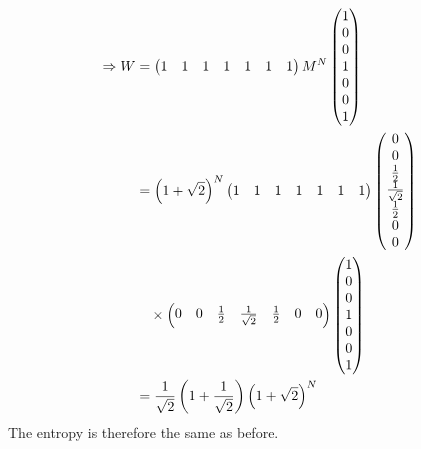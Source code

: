 \begin{align*}
    \Rightarrow W
    &= \begin{pmatrix}
        1 & 1 & 1 & 1 & 1 & 1 & 1
    \end{pmatrix}
    M^N \begin{pmatrix}
        1 \\ 0 \\ 0 \\ 1 \\ 0 \\ 0 \\ 1
    \end{pmatrix} \\
    &= {\left( 1 + \sqrt{2} \right)}^N
    \begin{pmatrix}
        1 & 1 & 1 & 1 & 1 & 1 & 1
    \end{pmatrix}
    \begin{pmatrix}
        0 \\ 0 \\ \frac{1}{2} \\ \frac{1}{\sqrt{2}} \\ \frac{1}{2} \\ 0 \\ 0
    \end{pmatrix} \\
    &\quad \times \begin{pmatrix}
        0 & 0 & \frac{1}{2} & \frac{1}{\sqrt{2}} & \frac{1}{2} & 0 & 0
    \end{pmatrix} \begin{pmatrix}
        1 \\ 0 \\ 0 \\ 1 \\ 0 \\ 0 \\ 1
    \end{pmatrix} \\
    &= \frac{1}{\sqrt{2}} \left( 1 + \frac{1}{\sqrt{2}} \right) {\left( 1 + \sqrt{2} \right)}^N
\end{align*}
The entropy is therefore the same as before.
